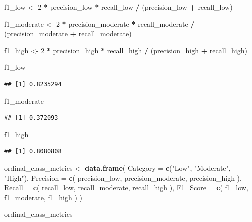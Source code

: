 \documentclass[
]{article}
\newenvironment{Shaded}{\begin{snugshade}}{\end{snugshade}}
\newcommand{\AttributeTok}[1]{\textcolor[rgb]{0.13,0.29,0.53}{#1}}
\newcommand{\DecValTok}[1]{\textcolor[rgb]{0.00,0.00,0.81}{#1}}
\newcommand{\FunctionTok}[1]{\textcolor[rgb]{0.13,0.29,0.53}{\textbf{#1}}}
\newcommand{\NormalTok}[1]{#1}
\newcommand{\OtherTok}[1]{\textcolor[rgb]{0.56,0.35,0.01}{#1}}
\newcommand{\SpecialCharTok}[1]{\textcolor[rgb]{0.81,0.36,0.00}{\textbf{#1}}}
\newcommand{\StringTok}[1]{\textcolor[rgb]{0.31,0.60,0.02}{#1}}
\begin{document}
\begin{Shaded}
\begin{Highlighting}[]
\NormalTok{f1\_low }\OtherTok{\textless{}{-}} \DecValTok{2} \SpecialCharTok{*}\NormalTok{ precision\_low }\SpecialCharTok{*}\NormalTok{ recall\_low }\SpecialCharTok{/}
\NormalTok{  (precision\_low }\SpecialCharTok{+}\NormalTok{ recall\_low)}

\NormalTok{f1\_moderate }\OtherTok{\textless{}{-}} \DecValTok{2} \SpecialCharTok{*}\NormalTok{ precision\_moderate }\SpecialCharTok{*}\NormalTok{ recall\_moderate }\SpecialCharTok{/}
\NormalTok{  (precision\_moderate }\SpecialCharTok{+}\NormalTok{ recall\_moderate)}

\NormalTok{f1\_high }\OtherTok{\textless{}{-}} \DecValTok{2} \SpecialCharTok{*}\NormalTok{ precision\_high }\SpecialCharTok{*}\NormalTok{ recall\_high }\SpecialCharTok{/}
\NormalTok{  (precision\_high }\SpecialCharTok{+}\NormalTok{ recall\_high)}

\NormalTok{f1\_low}
\end{Highlighting}
\end{Shaded}

\begin{verbatim}
## [1] 0.8235294
\end{verbatim}

\begin{Shaded}
\begin{Highlighting}[]
\NormalTok{f1\_moderate}
\end{Highlighting}
\end{Shaded}

\begin{verbatim}
## [1] 0.372093
\end{verbatim}

\begin{Shaded}
\begin{Highlighting}[]
\NormalTok{f1\_high}
\end{Highlighting}
\end{Shaded}

\begin{verbatim}
## [1] 0.8080808
\end{verbatim}

\begin{Shaded}
\begin{Highlighting}[]
\NormalTok{ordinal\_class\_metrics }\OtherTok{\textless{}{-}} \FunctionTok{data.frame}\NormalTok{(}
  \AttributeTok{Category =} \FunctionTok{c}\NormalTok{(}\StringTok{"Low"}\NormalTok{, }\StringTok{"Moderate"}\NormalTok{, }\StringTok{"High"}\NormalTok{),}
  \AttributeTok{Precision =} \FunctionTok{c}\NormalTok{(}
\NormalTok{    precision\_low,}
\NormalTok{    precision\_moderate,}
\NormalTok{    precision\_high}
\NormalTok{  ),}
  \AttributeTok{Recall =} \FunctionTok{c}\NormalTok{(}
\NormalTok{    recall\_low,}
\NormalTok{    recall\_moderate,}
\NormalTok{    recall\_high}
\NormalTok{  ),}
  \AttributeTok{F1\_Score =} \FunctionTok{c}\NormalTok{(}
\NormalTok{    f1\_low,}
\NormalTok{    f1\_moderate,}
\NormalTok{    f1\_high}
\NormalTok{  )}
\NormalTok{)}

\NormalTok{ordinal\_class\_metrics}
\end{Highlighting}
\end{Shaded}
\end{document}
